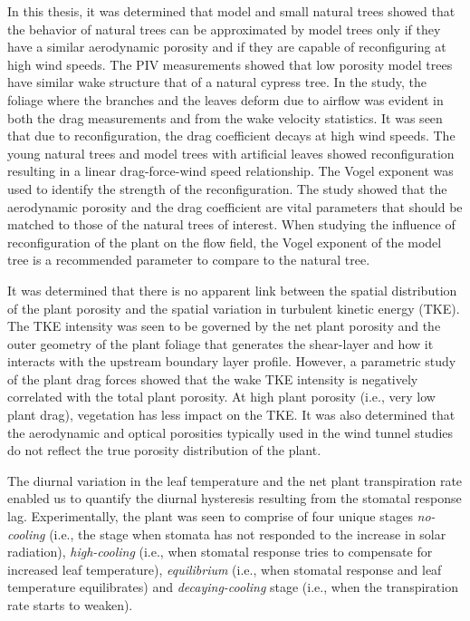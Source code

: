 In this thesis, it was determined that model and small natural trees showed that the behavior of natural trees can be approximated by model trees only if they have a similar aerodynamic porosity and if they are capable of reconfiguring at high wind speeds. The PIV measurements showed that low porosity model trees have similar wake structure that of a natural cypress tree. In the study, the foliage where the branches and the leaves deform due to airflow was evident in both the drag measurements and from the wake velocity statistics. It was seen that due to reconfiguration, the drag coefficient decays at high wind speeds. The young natural trees and model trees with artificial leaves showed reconfiguration resulting in a linear drag-force-wind speed relationship. The Vogel exponent was used to identify the strength of the reconfiguration. The study showed that the aerodynamic porosity and the drag coefficient are vital parameters that should be matched to those of the natural trees of interest. When studying the influence of reconfiguration of the plant on the flow field, the Vogel exponent of the model tree is a recommended parameter to compare to the natural tree.

It was determined that there is no apparent link between the spatial distribution of the plant porosity and the spatial variation in turbulent kinetic energy (TKE). The TKE intensity was seen to be governed by the net plant porosity and the outer geometry of the plant foliage that generates the shear-layer and how it interacts with the upstream boundary layer profile. However, a parametric study of the plant drag forces showed that the wake TKE intensity is negatively correlated with the total plant porosity. At high plant porosity (i.e., very low plant drag), vegetation has less impact on the TKE. It was also determined that the aerodynamic and optical porosities typically used in the wind tunnel studies do not reflect the true porosity distribution of the plant. 

The diurnal variation in the leaf temperature and the net plant transpiration rate enabled us to quantify the diurnal hysteresis resulting from the stomatal response lag. Experimentally, the plant was seen to comprise of four unique stages \textit{no-cooling} (i.e., the stage when stomata has not responded to the increase in solar radiation),\textit{ high-cooling} (i.e., when stomatal response tries to compensate for increased leaf temperature), \textit{equilibrium} (i.e., when stomatal response and leaf temperature equilibrates) and \textit{decaying-cooling} stage (i.e., when the transpiration rate starts to weaken). 

